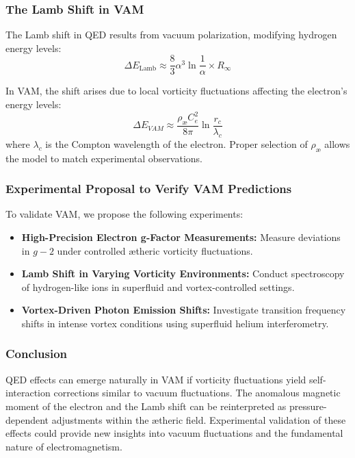 \subsubsection*{The Lamb Shift in VAM}
The Lamb shift in QED results from vacuum polarization, modifying hydrogen energy levels:
\begin{equation*}
    \Delta E_\text{Lamb} \approx \frac{8}{3} \alpha^3 \ln \frac{1}{\alpha} \times R_{\infty}
\end{equation*}

In VAM, the shift arises due to local vorticity fluctuations affecting the electron's energy levels:
\begin{equation*}
    \Delta E_{VAM} \approx \frac{\rho_\text{\ae} C_e^2}{8\pi} \ln \frac{r_c}{\lambda_c}
\end{equation*}
where $\lambda_c$ is the Compton wavelength of the electron. Proper selection of $\rho_\text{\ae}$ allows the model to match experimental observations.

\subsubsection*{Experimental Proposal to Verify VAM Predictions}
To validate VAM, we propose the following experiments:
\begin{itemize}
    \item \textbf{High-Precision Electron g-Factor Measurements:} Measure deviations in $g-2$ under controlled ætheric vorticity fluctuations.
    \item \textbf{Lamb Shift in Varying Vorticity Environments:} Conduct spectroscopy of hydrogen-like ions in superfluid and vortex-controlled settings.
    \item \textbf{Vortex-Driven Photon Emission Shifts:} Investigate transition frequency shifts in intense vortex conditions using superfluid helium interferometry.
\end{itemize}

\subsubsection*{Conclusion}
QED effects can emerge naturally in VAM if vorticity fluctuations yield self-interaction corrections similar to vacuum fluctuations. The anomalous magnetic moment of the electron and the Lamb shift can be reinterpreted as pressure-dependent adjustments within the ætheric field. Experimental validation of these effects could provide new insights into vacuum fluctuations and the fundamental nature of electromagnetism.